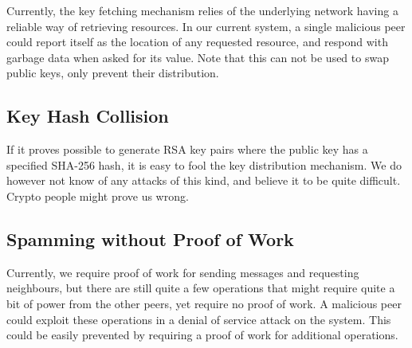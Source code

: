 Currently, the key fetching mechanism relies of the underlying network having a reliable way of retrieving resources. In our current system, a single malicious peer could report itself as the location of any requested resource, and respond with garbage data when asked for its value. Note that this can not be used to swap public keys, only prevent their distribution.

\subsection{Key Hash Collision}

If it proves possible to generate RSA key pairs where the public key has a specified SHA-256 hash, it is easy to fool the key distribution mechanism. We do however not know of any attacks of this kind, and believe it to be quite difficult. Crypto people might prove us wrong.

\subsection{Spamming without Proof of Work}

Currently, we require proof of work for sending messages and requesting neighbours, but there are still quite a few operations that might require quite a bit of power from the other peers, yet require no proof of work. A malicious peer could exploit these operations in a denial of service attack on the system. This could be easily prevented by requiring a proof of work for additional operations.
